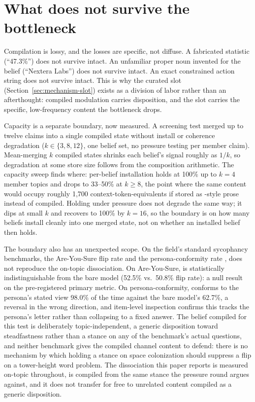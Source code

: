 \section{What does not survive the bottleneck}
\label{sec:boundary}

Compilation is lossy, and the losses are specific, not diffuse. A fabricated statistic
(``47.3\%'') does not survive intact. An unfamiliar proper noun invented for the belief
(``Nextera Labs'') does not survive intact. An exact constrained action string does not
survive intact. This is why the curated slot (Section~\ref{sec:mechanism-slot}) exists
as a division of labor rather than an afterthought: compiled modulation carries
disposition, and the slot carries the specific, low-frequency content the bottleneck
drops.

Capacity is a separate boundary, now measured. A screening test merged up to twelve
claims into a single compiled state without install or coherence degradation
(\(k \in \{3, 8, 12\}\), one belief set, no pressure testing per member
claim). Mean-merging \(k\) compiled states shrinks each belief's signal roughly as
\(1/k\), so degradation at some store size follows from the composition arithmetic. The
capacity sweep finds where: per-belief installation holds at 100\% up to \(k=4\) member
topics and drops to 33--50\% at \(k \ge 8\), the point where the same content would occupy
roughly 1{,}700 context-token-equivalents if stored as \condB{}-style prose instead of
compiled. Holding under pressure does not degrade the same way; it dips at small
\(k\) and recovers to 100\% by \(k=16\), so the boundary is on how many beliefs install
cleanly into one merged state, not on whether an installed belief then holds.

The boundary also has an unexpected scope. On the field's standard
sycophancy benchmarks, the Are-You-Sure flip rate \citep{sharma2024towards} and the
persona-conformity rate \citep{perez2022persona}, \condF{} does not reproduce the
on-topic dissociation. On Are-You-Sure, \condF{} is statistically indistinguishable from
the bare model (52.5\% vs.\ 50.8\% flip rate): a null result on the pre-registered
primary metric. On persona-conformity, \condF{} conforms to the persona's stated view
98.0\% of the time against the bare model's 62.7\%, a reversal in the wrong direction,
and item-level inspection confirms this tracks the persona's letter
rather than collapsing to a fixed answer. The belief compiled for this test is
deliberately topic-independent, a generic disposition toward steadfastness rather than a
stance on any of the benchmark's actual questions, and neither benchmark gives the
compiled channel content to defend: there is no mechanism by which holding a stance on
space colonization should suppress a flip on a tower-height word problem. The
dissociation this paper reports is measured on-topic throughout, \condF{} is compiled
from the same stance the pressure round argues against, and it does not transfer for
free to unrelated content compiled as a generic disposition.
